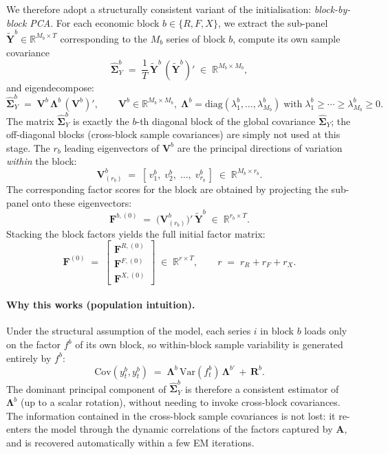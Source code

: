 \documentclass[11pt, a4paper, oneside]{article}
\begin{document}
We therefore adopt a structurally consistent variant of the
initialisation: \emph{block-by-block PCA}. For each economic block
$b \in \{R, F, X\}$, we extract the sub-panel
$\tilde{\mathbf{Y}}^b \in \mathbb{R}^{M_b \times T}$ corresponding
to the $M_b$ series of block $b$, compute its own sample covariance
\[
\widehat{\boldsymbol{\Sigma}}^b_Y \;=\; \frac{1}{T}\,\tilde{\mathbf{Y}}^b\,(\tilde{\mathbf{Y}}^b)'
\;\in\; \mathbb{R}^{M_b \times M_b},
\]
and eigendecompose:
\[
\widehat{\boldsymbol{\Sigma}}^b_Y \;=\; \mathbf{V}^b\,\boldsymbol{\Lambda}^b\,(\mathbf{V}^b)',
\qquad
\mathbf{V}^b \in \mathbb{R}^{M_b \times M_b},\;
\boldsymbol{\Lambda}^b = \mathrm{diag}(\lambda^b_1, \ldots, \lambda^b_{M_b})
\;\text{with}\; \lambda^b_1 \geq \cdots \geq \lambda^b_{M_b} \geq 0.
\]
The matrix $\widehat{\boldsymbol{\Sigma}}^b_Y$ is exactly the $b$-th
diagonal block of the global covariance $\widehat{\boldsymbol{\Sigma}}_Y$;
the off-diagonal blocks (cross-block sample covariances) are simply
not used at this stage. The $r_b$ leading eigenvectors of
$\mathbf{V}^b$ are the principal directions of variation
\emph{within} the block:
\[
\mathbf{V}^b_{(r_b)} \;=\; [\,v^b_1,\; v^b_2,\; \ldots,\; v^b_{r_b}\,]
\;\in\; \mathbb{R}^{M_b \times r_b}.
\]
The corresponding factor scores for the block are obtained by
projecting the sub-panel onto these eigenvectors:
\[
\mathbf{F}^{b,(0)} \;=\; \big(\mathbf{V}^b_{(r_b)}\big)'\,\tilde{\mathbf{Y}}^b
\;\in\; \mathbb{R}^{r_b \times T}.
\]
Stacking the block factors yields the full initial factor matrix:
\[
\mathbf{F}^{(0)} \;=\;
\begin{bmatrix}
\mathbf{F}^{R,(0)} \\[2pt]
\mathbf{F}^{F,(0)} \\[2pt]
\mathbf{F}^{X,(0)}
\end{bmatrix}
\;\in\; \mathbb{R}^{r \times T},
\qquad
r \;=\; r_R + r_F + r_X.
\]

\paragraph{Why this works (population intuition).}
Under the structural assumption of the model, each series $i$ in
block $b$ loads only on the factor $f^b$ of its own block, so
within-block sample variability is generated entirely by $f^b$:
\[
\mathrm{Cov}(y^b_t, y^b_t) \;=\;
\boldsymbol{\Lambda}^b\,\mathrm{Var}(f^b_t)\,\boldsymbol{\Lambda}^{b\prime}
\,+\, \mathbf{R}^b.
\]
The dominant principal component of $\widehat{\boldsymbol{\Sigma}}^b_Y$
is therefore a consistent estimator of $\boldsymbol{\Lambda}^b$ (up
to a scalar rotation), without needing to invoke cross-block
covariances. The information contained in the cross-block sample
covariances is not lost: it re-enters the model through the dynamic
correlations of the factors captured by $\mathbf{A}$, and is
recovered automatically within a few EM iterations.
\end{document}

